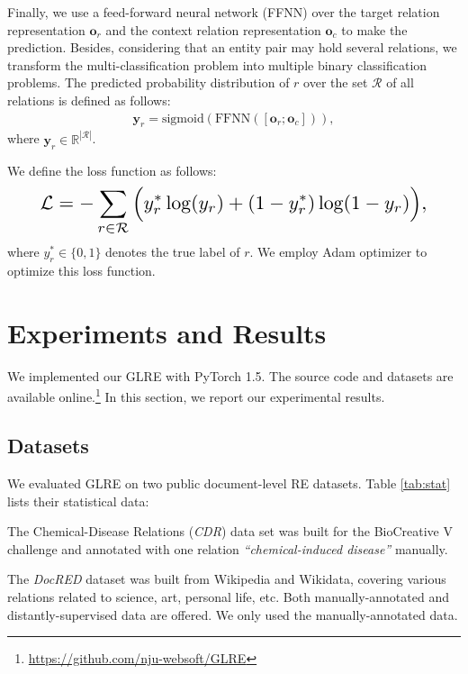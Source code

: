 \documentclass[11pt,a4paper]{article}
\begin{document}
Finally, we use a feed-forward neural network (FFNN) over the target relation representation $\mathbf{o}_r$ and the context relation representation $\mathbf{o}_c$ to make the prediction. Besides, considering that an entity pair may hold several relations, we transform the multi-classification problem into multiple binary classification problems. The predicted probability distribution of $r$ over the set $\mathcal{R}$ of all relations is defined as follows:
\begin{align}
\mathbf{y}_r = \mathrm{sigmoid}(\mathrm{FFNN}([\mathbf{o}_r; \mathbf{o}_c])),
\end{align}
where $\mathbf{y}_r\in\mathbb{R}^{|\mathcal{R}|}$.

We define the loss function as follows:
\begin{align}
\resizebox{.89\columnwidth}{!}{$\begin{aligned}
\mathcal{L} = -\sum_{r\in \mathcal{R}} \Big( y_r^* \log(y_r) + (1-y_r^*) \log(1-y_r) \Big),
\end{aligned}$}
\end{align}
where $y_r^*\in\{0,1\}$ denotes the true label of $r$. We employ Adam optimizer \cite{kingma2015adam} to optimize this loss function.
	
\section{Experiments and Results}
\label{sect:exp}

We implemented our GLRE with PyTorch 1.5. The source code and datasets are available online.\footnote{\url{https://github.com/nju-websoft/GLRE}} In this section, we report our experimental results.

\subsection{Datasets}

We evaluated GLRE on two public document-level RE datasets. Table \ref{tab:stat} lists their statistical data:
\begin{compactitem} 
\item The Chemical-Disease Relations (\emph{CDR}) data set \cite{li2016biocreative} was built for the BioCreative V challenge and annotated with one relation \textit{``chemical-induced disease''} manually.
	
\item The \emph{DocRED} dataset \cite{yao2019docred} was built from Wikipedia and Wikidata, covering various relations related to science, art, personal life, etc. Both manually-annotated and distantly-supervised data are offered. We only used the manually-annotated data.
\end{compactitem}
\end{document}
